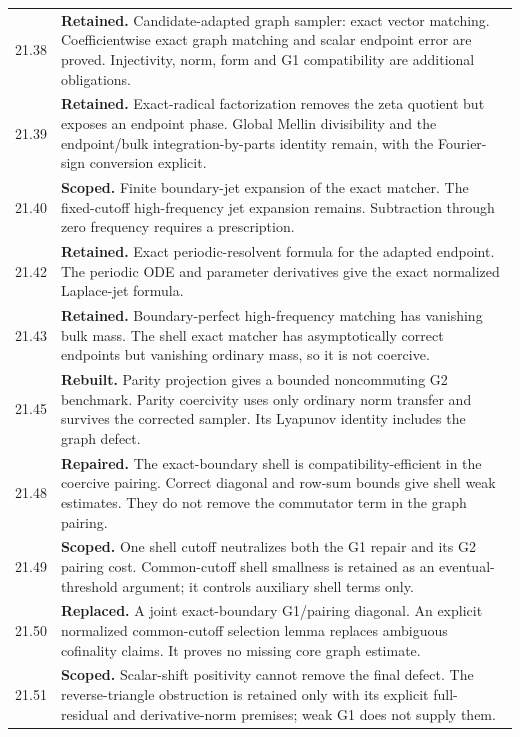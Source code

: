 \documentclass[11pt]{article}
\theoremstyle{remark}
\begin{document}
\begin{longtable}{@{}p{}p{}@{}}
21.38 & \textbf{Retained.} Candidate-adapted graph sampler: exact vector matching. Coefficientwise exact graph matching and scalar endpoint error are proved. Injectivity, norm, form and G1 compatibility are additional obligations. \\[4pt]
21.39 & \textbf{Retained.} Exact-radical factorization removes the zeta quotient but exposes an endpoint phase. Global Mellin divisibility and the endpoint/bulk integration-by-parts identity remain, with the Fourier-sign conversion explicit. \\[4pt]
21.40 & \textbf{Scoped.} Finite boundary-jet expansion of the exact matcher. The fixed-cutoff high-frequency jet expansion remains. Subtraction through zero frequency requires a prescription. \\[4pt]
21.42 & \textbf{Retained.} Exact periodic-resolvent formula for the adapted endpoint. The periodic ODE and parameter derivatives give the exact normalized Laplace-jet formula. \\[4pt]
21.43 & \textbf{Retained.} Boundary-perfect high-frequency matching has vanishing bulk mass. The shell exact matcher has asymptotically correct endpoints but vanishing ordinary mass, so it is not coercive. \\[4pt]
21.45 & \textbf{Rebuilt.} Parity projection gives a bounded noncommuting G2 benchmark. Parity coercivity uses only ordinary norm transfer and survives the corrected sampler. Its Lyapunov identity includes the graph defect. \\[4pt]
21.48 & \textbf{Repaired.} The exact-boundary shell is compatibility-efficient in the coercive pairing. Correct diagonal and row-sum bounds give shell weak estimates. They do not remove the commutator term in the graph pairing. \\[4pt]
21.49 & \textbf{Scoped.} One shell cutoff neutralizes both the G1 repair and its G2 pairing cost. Common-cutoff shell smallness is retained as an eventual-threshold argument; it controls auxiliary shell terms only. \\[4pt]
21.50 & \textbf{Replaced.} A joint exact-boundary G1/pairing diagonal. An explicit normalized common-cutoff selection lemma replaces ambiguous cofinality claims. It proves no missing core graph estimate. \\[4pt]
21.51 & \textbf{Scoped.} Scalar-shift positivity cannot remove the final defect. The reverse-triangle obstruction is retained only with its explicit full-residual and derivative-norm premises; weak G1 does not supply them. \\[4pt]
\end{longtable}
\normalsize
\end{document}

